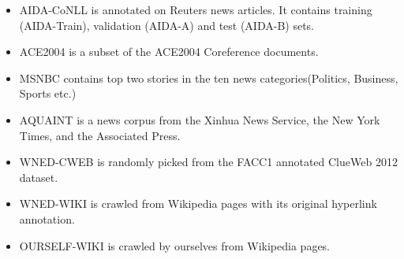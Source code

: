 \documentclass[sigconf]{acmart}
\begin{document}
\begin{itemize}
\item AIDA-CoNLL \cite{HoffartYBFPSTTW11} is annotated on Reuters news articles. It contains training (AIDA-Train), validation (AIDA-A) and test (AIDA-B) sets.
\item ACE2004 \cite{RatinovRDA11} is a subset of the ACE2004 Coreference documents.
\item MSNBC \cite{Cucerzan07} contains top  two  stories  in  the  ten news categories(Politics, Business, Sports etc.)
\item AQUAINT \cite{MilneW08} is a news corpus from the Xinhua News Service, the New York Times, and the Associated Press.
\item WNED-CWEB \cite{GuoB18} is randomly picked from the FACC1 annotated ClueWeb 2012 dataset.
\item WNED-WIKI \cite{GuoB18} is crawled from Wikipedia pages with its original hyperlink annotation.
\item OURSELF-WIKI is crawled by ourselves from Wikipedia pages.
\end{itemize} 

\begin{table}
\caption{Statistics of document and mention numbers on experimental datasets.}
\renewcommand\arraystretch{1.1}
\newcommand{\tabincell}[2]{\begin{tabular}{@{}#1@{}}#2\end{tabular}}
\centering
{}
\setlength{\abovecaptionskip}{8pt}
\end{table}
\end{document}
